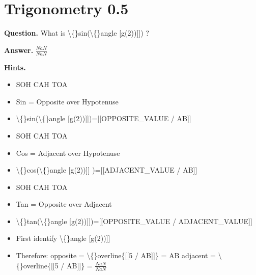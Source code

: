 \documentclass{article}
\begin{document}
\section*{Trigonometry 0.5}
\textbf{Question.} What is \textbackslash\{\}sin(\textbackslash\{\}angle [g(2))]]) ?

\textbf{Answer.} $\frac{NaN}{NaN}$

\textbf{Hints.}
\begin{itemize}
  \item SOH CAH TOA
  \item Sin = Opposite over Hypotenuse
  \item \textbackslash\{\}sin(\textbackslash\{\}angle [g(2))]])=[[OPPOSITE\_VALUE / AB]]
  \item SOH CAH TOA
  \item Cos = Adjacent over Hypotenuse
  \item \textbackslash\{\}cos(\textbackslash\{\}angle [g(2))]] )=[[ADJACENT\_VALUE / AB]]
  \item SOH CAH TOA
  \item Tan = Opposite over Adjacent
  \item \textbackslash\{\}tan(\textbackslash\{\}angle [g(2))]])=[[OPPOSITE\_VALUE / ADJACENT\_VALUE]]
  \item First identify \textbackslash\{\}angle [g(2))]]
  \item Therefore:
                opposite = \textbackslash\{\}overline\{[[5 / AB]]\} = AB
                adjacent = \textbackslash\{\}overline\{[[5 / AB]]\} = $\frac{NaN}{NaN}$
\end{itemize}
\end{document}
